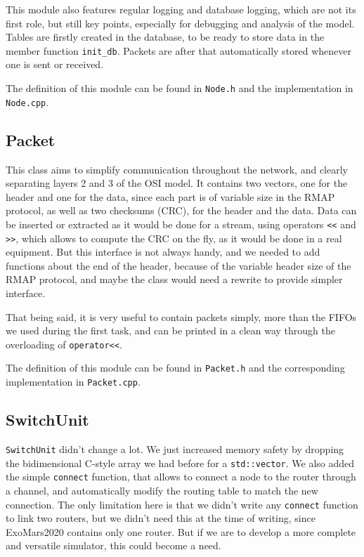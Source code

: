\documentclass[12pt,a4paper]{article}
\begin{document}
This module also features regular logging and database logging, which are not its first role, but still key points, especially for debugging and analysis of the model. Tables are firstly created in the database, to be ready to store data in the member function \texttt{init\_db}. Packets are after that automatically stored whenever one is sent or received.

The definition of this module can be found in \texttt{Node.h} and the implementation in \texttt{Node.cpp}.

\subsection{Packet}
This class aims to simplify communication throughout the network, and clearly separating layers 2 and 3 of the OSI model. It contains two vectors, one for the header and one for the data, since each part is of variable size in the RMAP protocol, as well as two checksums (CRC), for the header and the data. Data can be inserted or extracted as it would be done for a stream, using operators \verb|<<| and \verb|>>|, which allows to compute the CRC on the fly, as it would be done in a real equipment. But this interface is not always handy, and we needed to add functions about the end of the header, because of the variable header size of the RMAP protocol, and maybe the class would need a rewrite to provide simpler interface.

That being said, it is very useful to contain packets simply, more than the FIFOs we used during the first task, and can be printed in a clean way through the overloading of  \verb|operator<<|.

The definition of this module can be found in \texttt{Packet.h} and the corresponding implementation in \texttt{Packet.cpp}.
\subsection{SwitchUnit}
\texttt{SwitchUnit} didn't change a lot. We just increased memory safety by dropping the bidimensional C-style array we had before for a \texttt{std::vector}. We also added the simple \texttt{connect} function, that allows to connect a node to the router through a channel, and automatically modify the routing table to match the new connection. The only limitation here is that we didn't write any \texttt{connect} function to link two routers, but we didn't need this at the time of writing, since ExoMars2020 contains only one router. But if we are to develop a more complete and versatile simulator, this could become a need.
\end{document}
